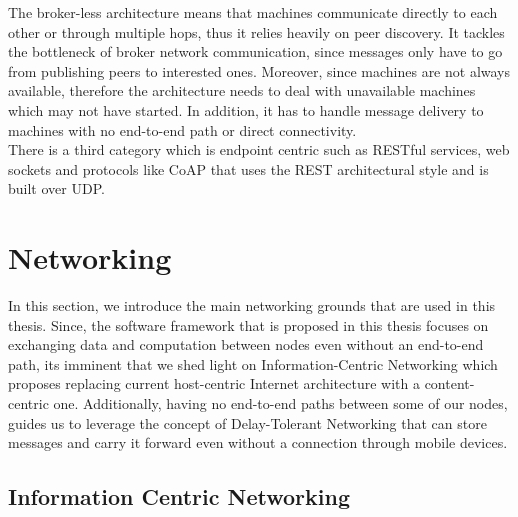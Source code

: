 \noindent The broker-less architecture means that machines communicate directly to each other or through multiple hops, thus it relies heavily on peer discovery. It tackles the bottleneck of broker network communication, since messages only have to go from publishing peers to interested ones.  Moreover, since machines are not always available, therefore the architecture needs to deal with unavailable machines which may not have started. In addition, it has to handle message delivery to machines with no end-to-end path or direct connectivity.  \\


\noindent There is a third category which is endpoint centric such as RESTful services, web sockets and protocols like CoAP \cite{coAP} that uses the REST architectural style and is built over UDP.

\section{Networking}

In this section, we introduce the main networking grounds that are used in this thesis. Since, the software framework that is proposed in this thesis focuses on exchanging data and computation between nodes even without an end-to-end path, its imminent that we shed light on Information-Centric Networking which proposes replacing current host-centric  Internet architecture  with a content-centric one. Additionally,  having no end-to-end paths between some  of our nodes, guides us to leverage the concept of Delay-Tolerant Networking that can store messages and carry it forward even without a connection through mobile devices.
\subsection{Information Centric Networking}

